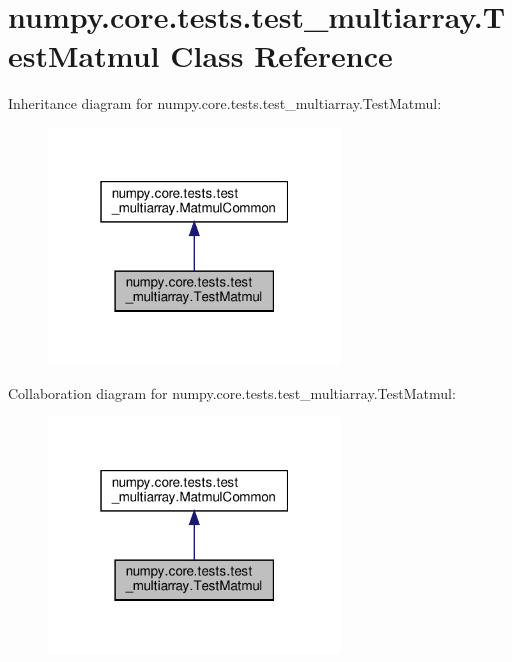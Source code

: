 \hypertarget{classnumpy_1_1core_1_1tests_1_1test__multiarray_1_1TestMatmul}{}\section{numpy.\+core.\+tests.\+test\+\_\+multiarray.\+Test\+Matmul Class Reference}
\label{classnumpy_1_1core_1_1tests_1_1test__multiarray_1_1TestMatmul}


Inheritance diagram for numpy.\+core.\+tests.\+test\+\_\+multiarray.\+Test\+Matmul\+:
\nopagebreak
\begin{figure}[H]
\begin{center}
\leavevmode
\includegraphics[width=220pt]{classnumpy_1_1core_1_1tests_1_1test__multiarray_1_1TestMatmul__inherit__graph}
\end{center}
\end{figure}


Collaboration diagram for numpy.\+core.\+tests.\+test\+\_\+multiarray.\+Test\+Matmul\+:
\nopagebreak
\begin{figure}[H]
\begin{center}
\leavevmode
\includegraphics[width=220pt]{classnumpy_1_1core_1_1tests_1_1test__multiarray_1_1TestMatmul__coll__graph}
\end{center}
\end{figure}
